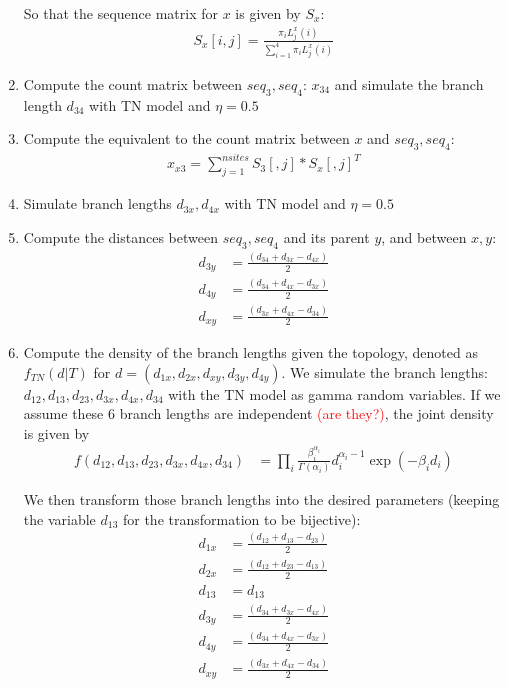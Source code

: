 \documentclass[12pt,letterpaper]{article}
\newcommand{\falta}[1]{\textcolor{red}{#1}}
\begin{document}
\begin{enumerate}
So that the sequence matrix for $x$ is given by $S_x$:
\begin{align*}
S_x[i,j] = \frac{\pi_i L^x_j(i)}{\sum_{i=1}^4 \pi_i L^x_j(i)}
\end{align*}

\item Compute the count matrix between $seq_3,seq_4$: $x_{34}$ and
  simulate the branch length $d_{34}$ with TN model and
  $\eta=0.5$
\item Compute the equivalent to the count matrix between $x$ and
  $seq_3,seq_4$:
\begin{align*}
x_{x3}=\sum_{j=1}^{nsites} S_3[,j]*S_x[,j]^T
\end{align*}
\item Simulate branch lengths $d_{3x}, d_{4x}$ with TN model
  and $\eta=0.5$
\item Compute the distances between $seq_3,seq_4$ and its parent $y$,
  and between $x,y$:
\begin{align*}
  d_{3y} &= \frac{(d_{34}+d_{3x}-d_{4x})}{2} \\
  d_{4y} &= \frac{(d_{34}+d_{4x}-d_{3x})}{2} \\
  d_{xy} &= \frac{(d_{3x}+d_{4x}-d_{34})}{2}
\end{align*}

\item Compute the density of the branch lengths given the topology,
  denoted as $f_{TN}(d|T)$ for
  $d=(d_{1x},d_{2x},d_{xy},d_{3y},d_{4y})$.  We simulate the branch
  lengths: $d_{12},d_{13},d_{23},d_{3x},d_{4x},d_{34}$ with the TN
  model as gamma random variables. If we assume these 6 branch lengths
  are independent \falta{(are they?)}, the joint density is given by
  \begin{align*}
    f(d_{12},d_{13},d_{23},d_{3x},d_{4x},d_{34}) &= \prod_{i}
    \frac{\beta_i^{\alpha_i}}{\Gamma(\alpha_i)} d_i^{\alpha_i-1} \exp{(-\beta_id_i)}
  \end{align*}

  We then transform those branch lengths into the desired parameters
  (keeping the variable $d_{13}$ for the transformation to be
  bijective):
  \begin{align*}
    d_{1x} &= \frac{(d_{12}+d_{13}-d_{23})}{2} \\
    d_{2x} &= \frac{(d_{12}+d_{23}-d_{13})}{2} \\
    d_{13} &= d_{13} \\
    d_{3y} &= \frac{(d_{34}+d_{3x}-d_{4x})}{2} \\
    d_{4y} &= \frac{(d_{34}+d_{4x}-d_{3x})}{2} \\
    d_{xy} &= \frac{(d_{3x}+d_{4x}-d_{34})}{2}
  \end{align*}
  

\end{enumerate}
\end{document}
